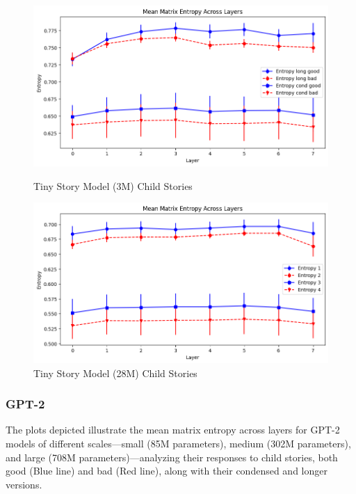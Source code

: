\documentclass{article}
\begin{document}
\begin{figure}[H]
    \centering
    \begin{minipage}{0.5\linewidth}
        \includegraphics[width=\linewidth]{Tiny_Child_Stories.png}
        \caption{Tiny Story Model (3M) Child Stories}
        \label{fig:Tiny_child}
    \end{minipage}\hfill
    \begin{minipage}{0.5\linewidth}
        \includegraphics[width=\linewidth]{Tiny_l_Child_Stories.png}
        \caption{Tiny Story Model (28M) Child Stories}
        \label{fig:Tiny_l_child}
    \end{minipage}\hfill
\end{figure}


\subsubsection{GPT-2}

The plots depicted illustrate the mean matrix entropy across layers for GPT-2 models of different scales—small (85M parameters), medium (302M parameters), and large (708M parameters)—analyzing their responses to child stories, both good (Blue line) and bad (Red line), along with their condensed and longer versions.
\end{document}
